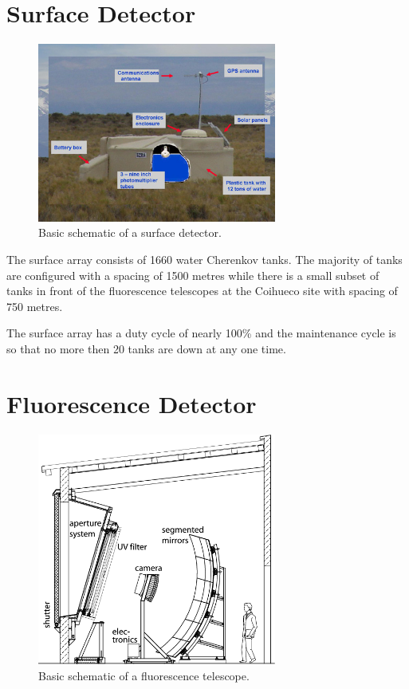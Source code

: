 \section{Surface Detector}

\begin{figure}
\centering
\includegraphics[width=0.7\textwidth]{chapters/pix/inside_surface_detector.jpg}
\caption{Basic schematic of a surface detector.}
\label{fig:SD_schematic}
\end{figure}

The surface array consists of 1660 water Cherenkov tanks. The majority of tanks are configured with a spacing of 1500 metres while there is a small subset of tanks in front of the fluorescence telescopes at the Coihueco site with spacing of 750 metres. 

The surface array has a duty cycle of nearly 100\% and the maintenance cycle is so that no more then 20 tanks are down at any one time.

\section{Fluorescence Detector}

\begin{figure}
\centering
\includegraphics[width=0.7\textwidth]{chapters/pix/fluorescence_telescope.png}
\caption{Basic schematic of a fluorescence telescope.}
\label{fig:FD_schematic}
\end{figure}

